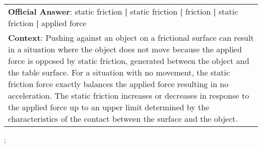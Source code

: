 \begin{figure*}[ht]
{\begin{tabular}{p{}}
            \textbf{Official Answer}: static friction \textbf{|} static friction \textbf{|} friction \textbf{|} static friction \textbf{|} applied force                                                                                                                                                                                                                                                                                                                                                                                                                 \\
            \textbf{Context}: Pushing against an object on a frictional surface can result in a situation where the object does not move because the applied force is opposed by static friction, generated between the object and the table surface. For a situation with no movement, the static friction force exactly balances the applied force resulting in no acceleration. The static friction increases or decreases in response to the applied force up to an upper limit determined by the characteristics of the contact between the surface and the object. \\
        \end{tabular}
    };
    \label{fig:ex-57376df3c3c5551400e51ed7}
\end{figure*}

